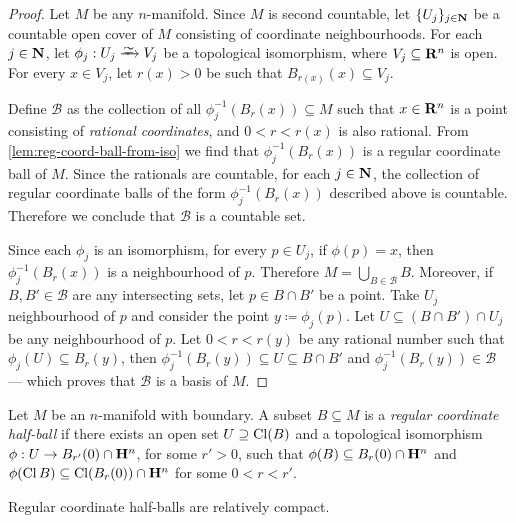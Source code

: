 \begin{proof}
Let \(M\) be any \(n\)-manifold. Since \(M\) is second countable, let
\(\{U_{j}\}_{j \in \mathbf{N}}\) be a countable open cover of \(M\) consisting of
coordinate neighbourhoods. For each \(j \in \mathbf{N}\), let \(\phi_j: U_j \isoto V_j\)
be a topological isomorphism, where \(V_j \subseteq \mathbf{R}^n\) is open. For every
\(x \in V_j\), let \(r(x) > 0\) be such that \(B_{r(x)}(x) \subseteq V_j\).

Define \(\mathcal{B}\) as the collection of all \(\phi_j^{-1}(B_{r}(x))
\subseteq M\) such that \(x \in \mathbf{R}^n\) is a point consisting of \emph{rational
  coordinates}, and \(0 < r < r(x)\) is also rational. From
\cref{lem:reg-coord-ball-from-iso} we find that \(\phi_j^{-1}(B_r(x))\) is a
regular coordinate ball of \(M\). Since the rationals are countable, for each
\(j \in \mathbf{N}\), the collection of regular coordinate balls of the form
\(\phi_j^{-1}(B_r(x))\) described above is countable. Therefore we conclude that
\(\mathcal{B}\) is a countable set.

Since each \(\phi_j\) is an isomorphism, for every \(p \in U_j\), if
\(\phi(p) = x\), then \(\phi_j^{-1}(B_r(x))\) is a neighbourhood of
\(p\). Therefore \(M = \bigcup_{B \in \mathcal{B}} B\). Moreover, if
\(B, B' \in \mathcal{B}\) are any intersecting sets, let \(p \in B \cap B'\) be
a point. Take \(U_j\) neighbourhood of \(p\) and consider the point
\(y \coloneq \phi_j(p)\). Let \(U \subseteq (B \cap B') \cap U_j\) be any
neighbourhood of \(p\). Let \(0 < r < r(y)\) be any rational number such that
\(\phi_j(U) \subseteq B_r(y)\), then
\(\phi_j^{-1}(B_r(y)) \subseteq U \subseteq B \cap B'\) and
\(\phi_j^{-1}(B_r(y)) \in \mathcal{B}\) --- which proves that \(\mathcal{B}\) is
a basis of \(M\).
\end{proof}

\begin{definition}
\label{def:reg-coord-half-ball}
Let \(M\) be an \(n\)-manifold with boundary. A subset \(B \subseteq M\) is a
\emph{regular coordinate half-ball} if there exists an open set
\(U \supseteq \operatorname{Cl}(B)\) and a topological isomorphism
\(\phi: U \to B_{r'}(0) \cap \mathbf{H}^n\), for some \(r' > 0\), such that
\(\phi(B) \subseteq B_r(0) \cap \mathbf{H}^n\) and
\(\phi(\operatorname{Cl} B) \subseteq \operatorname{Cl}(B_r(0)) \cap \mathbf{H}^n\) for some \(0 < r < r'\).
\end{definition}

\begin{corollary}
\label{cor:reg-coord-balls-are-rel-cpct}
Regular coordinate half-balls are relatively compact.
\end{corollary}

